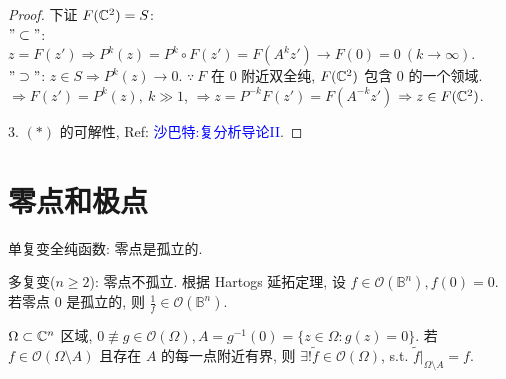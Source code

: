 \begin{proof}
下证 $F({\mathbb C}^2)=S$: \\
$"\subset "$: $z=F(z') \Rightarrow P^k(z)=P^k \circ F(z')=F(A^k z') \to F(0)=0 ~(k \to \infty  ).$  \\
$"\supset "$: $z \in S \Rightarrow P^k(z) \to 0.$ 
$\because ~ F$ 在 $0$  附近双全纯, $F({\mathbb C}^2)$ 包含 $0$  的一个领域. \\
$\Rightarrow F(z')=P^k(z), ~ k \gg 1$, 
$\Rightarrow z=P^{-k}F(z')=F(A^{-k} z')$
$\Rightarrow z \in F({\mathbb C}^2)$.    

3. $(*)$ 的可解性, Ref: \textcolor{blue}{沙巴特:复分析导论II}. 
\end{proof}

\section{零点和极点}

单复变全纯函数: 零点是孤立的.

多复变($n \geq 2$): 零点不孤立. 根据 Hartogs 延拓定理, 设 $f \in \mathcal{O} ( \mathbb{B}^n), f(0)=0$. 若零点 $0$  是孤立的, 则 $\frac{1}{f} \in \mathcal{O} ( \mathbb{B}^n)$.  

\begin{theorem}
  $\Omega \subset {\mathbb C}^n$ 区域, $0 \not \equiv g \in \mathcal{O}(\Omega ), A =g^{-1}(0)=\{z \in  \Omega :g(z)=0\}$. 
  若 $f \in \mathcal{O}(\Omega \setminus A)$ 
  且存在 $A$  的每一点附近有界, 则 $\exists ! \tilde{f} \in \mathcal{O}(\Omega )$, s.t. $\tilde{f}|_{\Omega \setminus A}=f$.    
\end{theorem}

